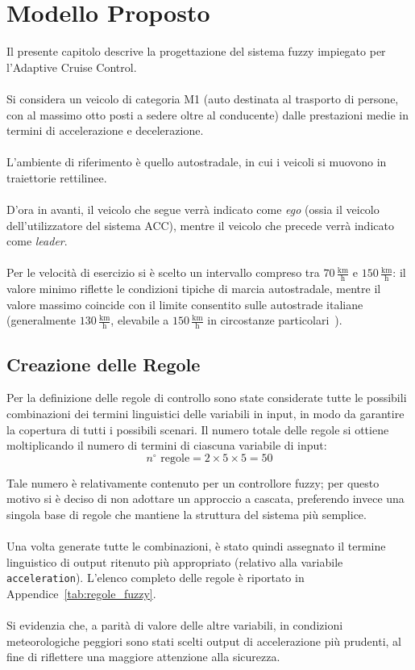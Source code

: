 \chapter{Modello Proposto}

Il presente capitolo descrive la progettazione del sistema fuzzy impiegato per l'Adaptive Cruise Control.  
\\\\
Si considera un veicolo di categoria M1 (auto destinata al trasporto di persone, con al massimo otto posti a sedere oltre al conducente)
dalle prestazioni medie in termini di accelerazione e decelerazione.  
\\\\
L'ambiente di riferimento è quello autostradale, in cui i veicoli si muovono in traiettorie rettilinee.  
\\\\
D'ora in avanti, il veicolo che segue verrà indicato come \emph{ego} (ossia il veicolo dell'utilizzatore del sistema ACC), 
mentre il veicolo che precede verrà indicato come \emph{leader}.  
\\\\
Per le velocità di esercizio si è scelto un intervallo compreso tra \(70\,\text{$\frac{\mathrm{km}}{\mathrm{h}}$}\) e \(150\,\text{$\frac{\mathrm{km}}{\mathrm{h}}$}\): 
il valore minimo riflette le condizioni tipiche di marcia autostradale, mentre il valore massimo coincide con il limite consentito 
sulle autostrade italiane (generalmente \(130\,\text{$\frac{\mathrm{km}}{\mathrm{h}}$}\), elevabile a \(150\,\text{$\frac{\mathrm{km}}{\mathrm{h}}$}\) in circostanze particolari~\cite{limite_autostrada_150}).  
 



\section{Creazione delle Regole}
Per la definizione delle regole di controllo sono state considerate tutte le possibili combinazioni dei termini linguistici 
delle variabili in input, in modo da garantire la copertura di tutti i possibili scenari.  
Il numero totale delle regole si ottiene moltiplicando il numero di termini di ciascuna variabile di input:
\[
n^\circ \text{ regole} = 2 \times 5 \times 5 = 50
\]

\noindent Tale numero è relativamente contenuto per un controllore fuzzy; per questo motivo si è deciso di non adottare un 
approccio a cascata, preferendo invece una singola base di regole che 
mantiene la struttura del sistema più semplice.  
\\\\
\noindent Una volta generate tutte le combinazioni, è stato quindi assegnato il termine linguistico di output ritenuto più appropriato 
(relativo alla variabile \texttt{acceleration}).    
L'elenco completo delle regole è riportato in Appendice~\ref{tab:regole_fuzzy}.  
\\\\
\noindent Si evidenzia che, a parità di valore delle altre variabili, in condizioni meteorologiche peggiori sono stati scelti 
output di accelerazione più prudenti, al fine di riflettere una maggiore attenzione alla sicurezza.
